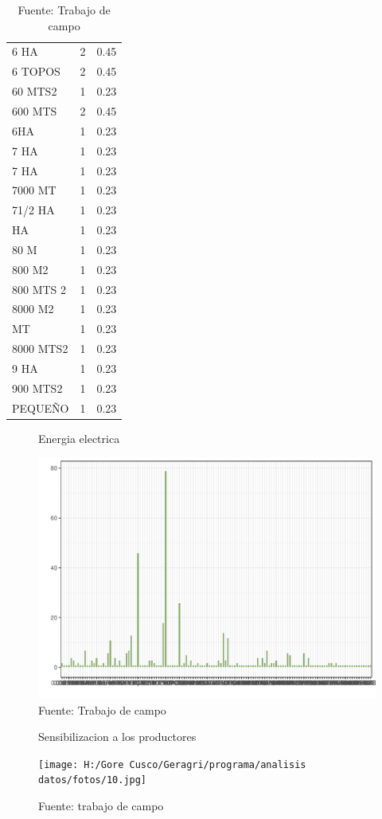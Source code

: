 \documentclass{article}\usepackage[]{graphicx}\usepackage[table]{xcolor}
\makeatletter
\def\maxwidth{ %
  \ifdim\Gin@nat@width>\linewidth
    \linewidth
  \else
    \Gin@nat@width
  \fi
}
\newenvironment{knitrout}{}{} %
\makeatother
\begin{document}
\begin{table}[H]
\begin{tabular}{lcl}
6 HA & 2 & 0.45\\
6 TOPOS & 2 & 0.45\\
60 MTS2 & 1 & 0.23\\
600 MTS & 2 & 0.45\\
\addlinespace
6HA & 1 & 0.23\\
7 HA & 1 & 0.23\\
7 HA & 1 & 0.23\\
7000 MT & 1 & 0.23\\
71/2 HA & 1 & 0.23\\
\addlinespace
8 HA & 1 & 0.23\\
80 M & 1 & 0.23\\
800 M2 & 1 & 0.23\\
800 MTS 2 & 1 & 0.23\\
8000 M2 & 1 & 0.23\\
\addlinespace
8000 MT & 1 & 0.23\\
8000 MTS2 & 1 & 0.23\\
9 HA & 1 & 0.23\\
900 MTS2 & 1 & 0.23\\
PEQUEÑO & 1 & 0.23\\
\bottomrule
\end{tabular}

  \caption*{Fuente: Trabajo de campo}
\end{table}

\begin{figure}[H]
  \centering
  \caption{Energia electrica}
\begin{knitrout}
\color{fgcolor}
\includegraphics[width=\maxwidth]{figure/fig_trece-1} 
\end{knitrout}
  \caption*{Fuente: Trabajo de campo}
\end{figure}

\begin{figure}[H]
  \centering
  \caption{Sensibilizacion a los productores}
  \texttt{[image: H:/Gore Cusco/Geragri/programa/analisis datos/fotos/10.jpg]}
  \caption*{Fuente: trabajo de campo}
\end{figure}
\end{document}
